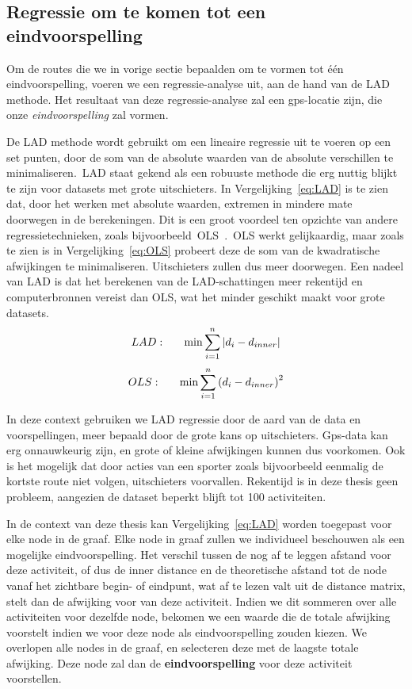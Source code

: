 \subsection{Regressie om te komen tot een eindvoorspelling}\label{sec:lad}
Om de routes die we in vorige sectie bepaalden om te vormen tot één
eindvoorspelling, voeren we een regressie-analyse uit, aan de hand van de
\ac{LAD} methode. Het resultaat van deze regressie-analyse zal een
\ac{gps}-locatie zijn, die onze \textit{eindvoorspelling} zal vormen.

De \ac{LAD} methode wordt gebruikt om een lineaire regressie uit te voeren op
een set punten, door de som van de absolute waarden van de absolute verschillen
te minimaliseren.\ \ac{LAD} staat gekend als een robuuste methode die erg
nuttig blijkt te zijn voor datasets met grote uitschieters. In
Vergelijking~\ref{eq:LAD} is te zien dat, door het werken met absolute waarden,
extremen in mindere mate doorwegen in de berekeningen. Dit is een groot
voordeel ten opzichte van andere regressietechnieken, zoals
bijvoorbeeld~\ac{OLS}~\cite{iqbal2021application}.~\ac{OLS} werkt gelijkaardig,
maar zoals te zien is in Vergelijking~\ref{eq:OLS} probeert deze de som van de
kwadratische afwijkingen te minimaliseren. Uitschieters zullen dus meer
doorwegen. Een nadeel van \ac{LAD} is dat het berekenen van de LAD-schattingen
meer rekentijd en computerbronnen vereist dan \ac{OLS}, wat het minder geschikt
maakt voor grote datasets.
\begin{equation} \label{eq:LAD}
    LAD:\indent  \min\sum\limits_{i=1}^n|d_i - d_{inner}|
\end{equation}
\begin{equation} \label{eq:OLS}
    OLS:\indent  \min\sum\limits_{i=1}^n{(d_i - d_{inner})}^2
\end{equation}

In deze context gebruiken we LAD regressie door de aard van de data en
voorspellingen, meer bepaald door de grote kans op uitschieters. Gps-data kan
erg onnauwkeurig zijn, en grote of kleine afwijkingen kunnen dus voorkomen. Ook
is het mogelijk dat door acties van een sporter zoals bijvoorbeeld eenmalig de
kortste route niet volgen, uitschieters voorvallen. Rekentijd is in deze thesis
geen probleem, aangezien de dataset beperkt blijft tot 100 activiteiten.

In de context van deze thesis kan Vergelijking~\ref{eq:LAD} worden toegepast
voor elke node in de graaf. Elke node in graaf zullen we individueel beschouwen
als een mogelijke eindvoorspelling. Het verschil tussen de nog af te leggen
afstand voor deze activiteit, of dus de inner distance en de theoretische
afstand tot de node vanaf het zichtbare begin- of eindpunt, wat af te lezen
valt uit de distance matrix, stelt dan de afwijking voor van deze activiteit.
Indien we dit sommeren over alle activiteiten voor dezelfde node, bekomen we
een waarde die de totale afwijking voorstelt indien we voor deze node als
eindvoorspelling zouden kiezen. We overlopen alle nodes in de graaf, en
selecteren deze met de laagste totale afwijking. Deze node zal dan de
\textbf{eindvoorspelling} voor deze activiteit voorstellen.

